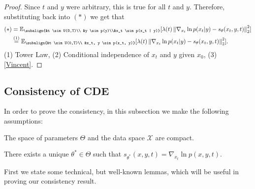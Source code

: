 \begin{proof}
    Since $t$ and $y$ were arbitrary, this is true for all $t$ and $y$. Therefore, substituting back into $(*)$ we get that
    \begin{align*}
        (*) &= \mathbb{E}_{\subalign{&t \sim U(0,T)\\ &y \sim p(y)\\&x_t \sim p(x_t | y)}} 
            [\lambda(t) \norm{\nabla_{x_t} \ln{p(x_t | y)} - s_\theta(x_t, y, t)}_2^2]\\
        &\overset{(1)}{=} \mathbb{E}_{\subalign{&t \sim U(0,T)\\ &x_t, y \sim p(x_t, y)}} 
        [\lambda(t) \norm{\nabla_{x_t} \ln{p(x_t | y)} - s_\theta(x_t, y,t)}_2^2].
    \end{align*}
(1) Tower Law, (2) Conditional independence of $x_t$ and $y$ given $x_0$, (3)  \ref{Vincent}.
\end{proof}

\subsection{Consistency of CDE}
\label{appendix:consistency}
In order to prove the consistency, in this subsection we make the following assumptions:
\begin{assumption}
    \label{assum:compact_1}
    The space of parameters $\Theta$ and the data space $\mathcal{X}$ are compact.
\end{assumption}
\begin{assumption}
    \label{assum:unique}
    There exists a unique $\theta^\ast \in \Theta$ such that $s_{\theta^\ast}(x,y,t) = \nabla_{x_t}\ln p (x,y,t)$.
\end{assumption}

First we state some technical, but well-known lemmas, which will be useful in proving our consistency result.

